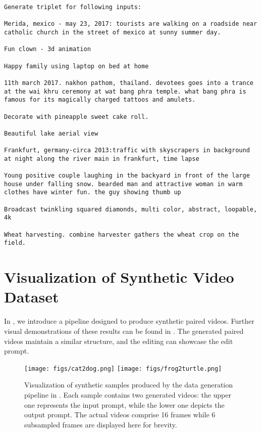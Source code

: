 \begin{Verbatim}[breaklines=true]
Generate triplet for following inputs:

Merida, mexico - may 23, 2017: tourists are walking on a roadside near catholic church in the street of mexico at sunny summer day.

Fun clown - 3d animation

Happy family using laptop on bed at home

11th march 2017. nakhon pathom, thailand. devotees goes into a trance at the wai khru ceremony at wat bang phra temple. what bang phra is famous for its magically charged tattoos and amulets.

Decorate with pineapple sweet cake roll.

Beautiful lake aerial view

Frankfurt, germany-circa 2013:traffic with skyscrapers in background at night along the river main in frankfurt, time lapse

Young positive couple laughing in the backyard in front of the large house under falling snow. bearded man and attractive woman in warm clothes have winter fun. the guy showing thumb up

Broadcast twinkling squared diamonds, multi color, abstract, loopable, 4k

Wheat harvesting. combine harvester gathers the wheat crop on the field.
\end{Verbatim}

\section{Visualization of Synthetic Video Dataset}\label{sec.appendix_synthetic_vid}
In , we introduce a pipeline designed to produce synthetic paired videos. Further visual demonstrations of these results can be found in . The generated paired videos maintain a similar structure, and the editing can showcase the edit prompt.

\begin{figure}
    \centering
    \texttt{[image: figs/cat2dog.png]}
    \texttt{[image: figs/frog2turtle.png]}
    \caption{Visualization of synthetic samples produced by the data generation pipeline in . Each sample contains two generated videos: the upper one represents the input prompt, while the lower one depicts the output prompt. The actual videos comprise 16 frames while 6 subsampled frames are displayed here for brevity.}
    \label{fig.synthetic_vid1}
\end{figure}

